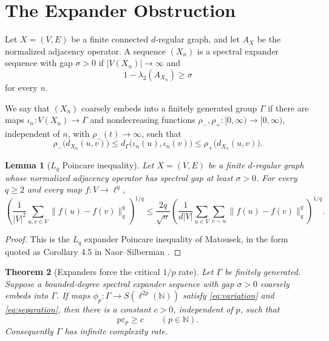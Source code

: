 \documentclass[11pt]{article}
\newtheorem{theorem}{Theorem}
\newtheorem{lemma}[theorem]{Lemma}
\newcommand{\N}{\mathbb{N}}
\newcommand{\eps}{\varepsilon}
\newcommand{\Sphere}{S}
\begin{document}
\section*{The Expander Obstruction}

Let \(X=(V,E)\) be a finite connected \(d\)-regular graph, and let \(A_X\) be
the normalized adjacency operator.  A sequence \((X_n)\) is a spectral expander
sequence with gap \(\sigma>0\) if \(|V(X_n)|\to\infty\) and
\[
  1-\lambda_2(A_{X_n})\ge \sigma
\]
for every \(n\).

We say that \((X_n)\) coarsely embeds into a finitely generated group
\(\Gamma\) if there are maps \(\iota_n:V(X_n)\to\Gamma\) and nondecreasing
functions \(\rho_-,\rho_+:[0,\infty)\to[0,\infty)\), independent of \(n\), with
\(\rho_-(t)\to\infty\), such that
\[
 \rho_-\bigl(d_{X_n}(u,v)\bigr)
 \le d_\Gamma\bigl(\iota_n(u),\iota_n(v)\bigr)
 \le \rho_+\bigl(d_{X_n}(u,v)\bigr).
\]

\begin{lemma}[\(L_q\) Poincare inequality]\label{lem:poincare}
Let \(X=(V,E)\) be a finite \(d\)-regular graph whose normalized adjacency
operator has spectral gap at least \(\sigma>0\).  For every \(q\ge 2\) and
every map \(f:V\to\ell^q\),
\[
 \left(
   \frac{1}{|V|^2}\sum_{u,v\in V}\|f(u)-f(v)\|_q^q
 \right)^{1/q}
 \le
 \frac{2q}{\sqrt\sigma}
 \left(
   \frac{1}{d|V|}\sum_{u\in V}\sum_{v\sim u}
        \|f(u)-f(v)\|_q^q
 \right)^{1/q}.
\]
\end{lemma}

\begin{proof}
This is the \(L_q\) expander Poincare inequality of Matousek, in the form
quoted as Corollary 4.5 in Naor--Silberman \cite{NaorSilberman2011}.
\end{proof}

\begin{theorem}[Expanders force the critical \(1/p\) rate]\label{thm:obstruction}
Let \(\Gamma\) be finitely generated.  Suppose a bounded-degree spectral
expander sequence with gap \(\sigma>0\) coarsely embeds into \(\Gamma\).  If
maps \(\phi_p:\Gamma\to \Sphere(\ell^{2p}(\N))\) satisfy
\eqref{eq:variation} and \eqref{eq:separation}, then there is a constant
\(c>0\), independent of \(p\), such that
\[
  p\eps_p\ge c \qquad (p\in\N).
\]
Consequently \(\Gamma\) has infinite complexity rate.
\end{theorem}
\end{document}
